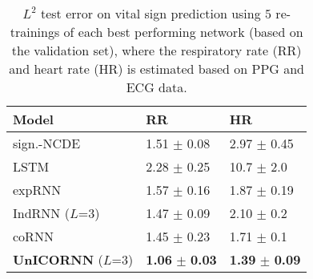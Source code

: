 \documentclass{article}
\begin{document}
\begin{table}[ht]
\caption{$L^2$ test error on vital sign prediction using $5$ re-trainings of each best performing network (based on the validation set), where the respiratory rate (RR) and heart rate (HR) is estimated based on PPG and ECG data.}
\label{tab:medical}
\vskip 0.15in
\begin{center}
\begin{small}
\begin{sc}
\begin{tabular}{lll}
\toprule
Model & RR & HR \\
\midrule
sign.-NCDE & 1.51 $\pm$ 0.08 &  2.97 $\pm$ 0.45  \\
LSTM  & 2.28 $\pm$ 0.25 & 10.7 $\pm$ 2.0  \\
expRNN & 1.57 $\pm$ 0.16 & 1.87 $\pm$ 0.19 \\
IndRNN ($L$=3) & 1.47 $\pm$ 0.09 & 2.10 $\pm$ 0.2 \\
coRNN & 1.45 $\pm$ 0.23 & 1.71 $\pm$ 0.1 \\
\textbf{UnICORNN} ($L$=3) &  \textbf{1.06} $\pm$ \textbf{0.03} & \textbf{1.39} $\pm$ \textbf{0.09}\\
\bottomrule
\end{tabular}
\end{sc}
\end{small}
\end{center}
\vskip -0.1in
\end{table}
\end{document}
